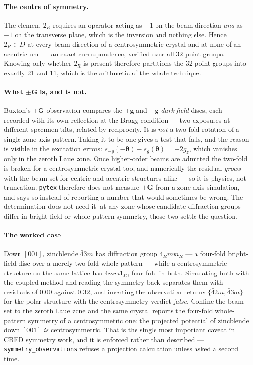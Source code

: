 \paragraph{The centre of symmetry.} The element \(2_R\) requires an operator acting as \(-1\) on
the beam direction \emph{and} as \(-1\) on the transverse plane, which is the inversion and
nothing else. Hence \(2_R \in D\) at every beam direction of a centrosymmetric crystal and at
none of an acentric one --- an exact correspondence, verified over all 32 point groups. Knowing
only whether \(2_R\) is present therefore partitions the 32 point groups into exactly 21 and 11,
which is the arithmetic of the whole technique.

\paragraph{What \(\pm\mathbf{G}\) is, and is not.} Buxton's \(\pm\mathbf{G}\) observation
compares the \(+\mathbf{g}\) and \(-\mathbf{g}\) \emph{dark-field} discs, each recorded with its
own reflection at the Bragg condition --- two exposures at different specimen tilts, related by
reciprocity. It is \emph{not} a two-fold rotation of a single zone-axis pattern. Taking it to be
one gives a test that fails, and the reason is visible in the excitation errors:
\(s_{-g}(-\boldsymbol{\theta}) - s_{g}(\boldsymbol{\theta}) = -2g_{z}\), which vanishes only in
the zeroth Laue zone. Once higher-order beams are admitted the two-fold is broken for a
centrosymmetric crystal too, and numerically the residual \emph{grows} with the beam set for
centric and acentric structures alike --- so it is physics, not truncation. \texttt{pytex}
therefore does not measure \(\pm\mathbf{G}\) from a zone-axis simulation, and says so instead of
reporting a number that would sometimes be wrong. The determination does not need it: at any
zone whose candidate diffraction groups differ in bright-field or whole-pattern symmetry, those
two settle the question.

\paragraph{The worked case.} Down \([001]\), zincblende \(\bar{4}3m\) has diffraction group
\(4_Rmm_R\) --- a four-fold bright-field disc over a merely two-fold whole pattern --- while a
centrosymmetric structure on the same lattice has \(4mm1_R\), four-fold in both. Simulating both
with the coupled method and reading the symmetry back separates them with residuals of \(0.00\)
against \(0.32\), and inverting the observation returns \(\{\bar{4}2m, \bar{4}3m\}\) for the
polar structure with the centrosymmetry verdict \emph{false}. Confine the beam set to the
zeroth Laue zone and the same crystal reports the four-fold whole-pattern symmetry of a
centrosymmetric one: the projected potential of zincblende down \([001]\) \emph{is}
centrosymmetric. That is the single most important caveat in CBED symmetry work, and it is
enforced rather than described --- \texttt{symmetry\_observations} refuses a projection
calculation unless asked a second time.

